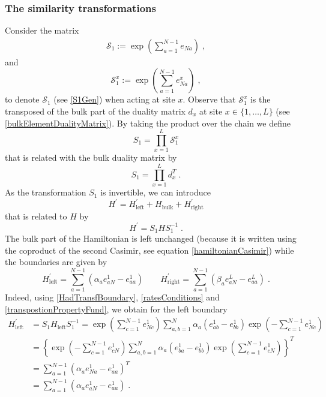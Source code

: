 \documentclass[10pt]{article}
\numberwithin{equation}{section}
\numberwithin{equation}{subsection}
\newcommand{\co}{\;,}
\newcommand{\dt}{\;.}
\begin{document}
\subsubsection{The similarity transformations}\label{subsectionSTransf}
Consider the matrix
\begin{align}
	\mathcal{S}_{1}:=\exp{\left(\sum_{a=1}^{N-1}e_{Na}\right)}\label{S1Gen}\co
\end{align}
and
\begin{equation}\label{transformationV}
 \mathcal{S}_{1}^{x}:=\exp{\left(\sum_{a=1}^{N-1}e_{Na}^{x}\right)}\co %
\end{equation}
to denote $\mathcal{S}_{1}$ (see \eqref{S1Gen}) when acting at site $x$. 
Observe that $\mathcal{S}_{1}^{x}$ is the transposed of the bulk part of the duality matrix $d_{x}$  at site $x\in \{1,\ldots,L\}$ (see \eqref{bulkElementDualityMatrix}). By taking the product over the chain we define
\begin{equation}\label{S1-Whole}
    S_{1}=\prod_{x=1}^{L}\mathcal{S}_{1}^{x}
\end{equation}
that is related with the bulk duality matrix by 
\begin{equation}
S_{1}=\prod_{x=1}^{L}d_{x}^{T}\dt
\end{equation}
 As the transformation $S_{1}$ is invertible,  we can introduce 
\begin{equation}\label{hatHamiltonian}
   H^{'}=H^{'}_{\text{left}}+H_{\text{bulk}}+H^{'}_{\text{right}}
\end{equation}
that is related to $H$ by
\begin{equation}\label{similarV}
   H^{'}=S_{1}HS_{1}^{-1}\dt
\end{equation}
The bulk part of the Hamiltonian is left unchanged (because it is written using the coproduct of the second Casimir, see equation \eqref{hamiltonianCasimir}) while the boundaries are given by 
\begin{equation}
	H^{'}_{\text{left}}=\sum_{a=1}^{N-1}\left(\alpha_{a}e_{aN}^{1}-e_{aa}^{1}\right)\qquad H^{'}_{\text{right}}=\sum_{a=1}^{N-1}\left(\beta_{a}e_{aN}^{L}-e_{aa}^{L}\right)\dt
\end{equation}
Indeed, using \eqref{HadTransfBoundary}, \eqref{ratesConditions} and \eqref{transpostionPropertyFund}, we obtain for the left boundary
\begin{equation}
	\begin{split}
		H_{\text{left}}^{'}&=S_{1}H_{\text{left}}S_{1}^{-1}=\exp{\left(\sum_{c=1}^{N-1}e_{Nc}^{1}\right)}\sum_{a,b=1}^{N}\alpha_{a}\left(e_{ab}^{1}-e_{bb}^{1}\right)\exp{\left(-\sum_{c=1}^{N-1}e_{Nc}^{1}\right)}
		\\&=
		\left\{\exp{\left(-\sum_{c=1}^{N-1}e_{cN}^{1}\right)}\sum_{a,b=1}^{N}\alpha_{a}\left(e_{ba}^{1}-e_{bb}^{1}\right)\exp{\left(\sum_{c=1}^{N-1}e_{cN}^{1}\right)}\right\}^{T}
		\\&=
		\sum_{a=1}^{N-1}\left(\alpha_{a}e_{Na}^{1}-e_{aa}^{1}\right)^{T}
		\\&=
		\sum_{a=1}^{N-1}\left(\alpha_{a}e_{aN}^{1}-e_{aa}^{1}\right)\dt
	\end{split}
\end{equation}
\end{document}
